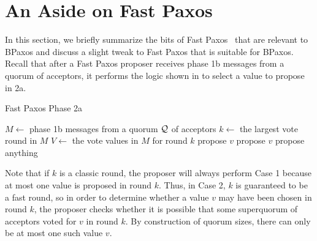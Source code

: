 \section{An Aside on Fast Paxos}
In this section, we briefly summarize the bits of Fast
Paxos~\cite{lamport2006fast} that are relevant to BPaxos and discuss a slight
tweak to Fast Paxos that is suitable for BPaxos. Recall that after a Fast Paxos
proposer receives phase 1b messages from a quorum of acceptors, it performs the
logic shown in  to select a value to propose in 2a.

\begin{algorithm}[ht]
  \caption{Fast Paxos Phase 2a}%
  \begin{algorithmic}[1]
    \State{} $M \gets$ phase 1b messages from a quorum $\mathcal{Q}$ of acceptors
    \State{} $k \gets$ the largest vote round in $M$
    \State{} $V \gets$ the vote values in $M$ for round $k$
      \State{} propose $v$
      \State{} propose $v$
    \Else{}
      \State{} propose anything
    \EndIf{}
  \end{algorithmic}
\end{algorithm}

Note that if $k$ is a classic round, the proposer will always perform Case 1
because at most one value is proposed in round $k$. Thus, in Case 2, $k$ is
guaranteed to be a fast round, so in order to determine whether a value $v$ may
have been chosen in round $k$, the proposer checks whether it is possible that
some superquorum of acceptors voted for $v$ in round $k$. By construction of
quorum sizes, there can only be at most one such value $v$.

